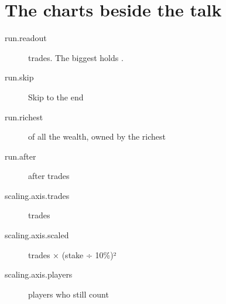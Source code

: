 \section{The charts beside the talk}

\begin{description}
  \item[run.readout]  trades. The biggest holds .
  \item[run.skip] Skip to the end
  \item[run.richest]  of all the wealth, owned by the richest
  \item[run.after] after  trades
  \item[scaling.axis.trades] trades
  \item[scaling.axis.scaled] trades × (stake ÷ 10\%)²
  \item[scaling.axis.players] players who still count
\end{description}
